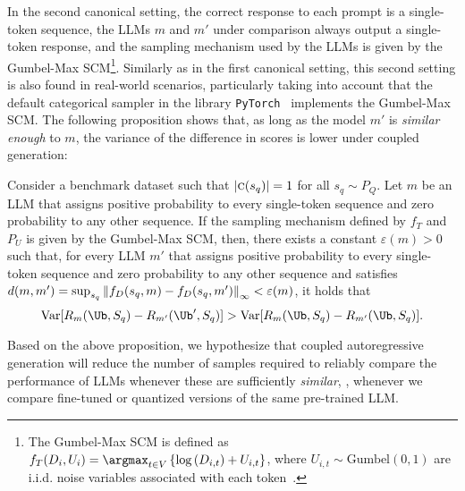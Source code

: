 In the second canonical setting, the correct response to each prompt is a single-token sequence, the LLMs $m$ and $m'$ under comparison always output a single-token response, and the sampling mechanism used by the LLMs is given by the Gumbel-Max SCM\footnote{The Gumbel-Max SCM is defined as $f_T(D_i, U_i) = \argmax_{t\in V} \left\{\log\left(D_{i,t}\right) + U_{i,t}\right\}$, where $U_{i,t} \sim \text{Gumbel}(0,1)$ are i.i.d. noise variables associated with each token~\citep{chatzi2024counterfactual}.}.
%
Similarly as in the first canonical setting, this second setting is also found in real-world scenarios, particularly taking into account that the default categorical sampler in the library \texttt{PyTorch}~\citep{paszke2019pytorch} implements the Gumbel-Max SCM.
%
The following proposition shows that, as long as the model $m'$ is \emph{similar enough} to $m$, the variance of the difference in scores is lower under coupled generation:
\begin{proposition}\label{prop:var_gumbel}
    Consider a benchmark dataset such that $|\textsc{c}(s_q)|=1$ for all $s_q \sim P_Q$. Let $m$ be an LLM that assigns positive probability to every single-token sequence and zero probability to any other sequence. 
    If the sampling mechanism defined by $f_T$ and $P_U$ is given by the Gumbel-Max SCM, then, there exists a constant $\varepsilon(m)>0$ such that, for every LLM $m'$ that assigns positive probability to every single-token sequence and zero probability to any other sequence and satisfies $d(m,m')=\sup_{s_q} \left\lVert f_D(s_q,m)-f_D(s_q, m')\right\rVert_\infty < \varepsilon(m)$, it holds that
    \begin{equation*}
        \textnormal{Var}[R_m(\Ub,S_q)-R_{m'}(\Ub',S_q)]
        > \textnormal{Var}[R_m(\Ub,S_q)-R_{m'}(\Ub,S_q)].
    \end{equation*}
\end{proposition}
%
Based on the above proposition, we hypothesize that coupled autoregressive generation will reduce the number of samples required to reliably compare the performance of LLMs whenever these are sufficiently \emph{similar}, \eg, whenever we compare fine-tuned or quantized versions of the same pre-trained LLM.
